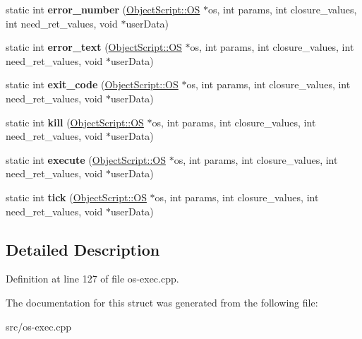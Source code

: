 \begin{DoxyCompactItemize}
\item 
static int {\bfseries error\+\_\+number} (\hyperlink{class_object_script_1_1_o_s}{Object\+Script\+::\+OS} $\ast$os, int params, int closure\+\_\+values, int need\+\_\+ret\+\_\+values, void $\ast$user\+Data)\hypertarget{struct_o_s_sub_process_a5b144fe5d751f4988e4debf73d14f3ed}{}\label{struct_o_s_sub_process_a5b144fe5d751f4988e4debf73d14f3ed}

\item 
static int {\bfseries error\+\_\+text} (\hyperlink{class_object_script_1_1_o_s}{Object\+Script\+::\+OS} $\ast$os, int params, int closure\+\_\+values, int need\+\_\+ret\+\_\+values, void $\ast$user\+Data)\hypertarget{struct_o_s_sub_process_a982f8ed232af4b48485adc2a59a46a6c}{}\label{struct_o_s_sub_process_a982f8ed232af4b48485adc2a59a46a6c}

\item 
static int {\bfseries exit\+\_\+code} (\hyperlink{class_object_script_1_1_o_s}{Object\+Script\+::\+OS} $\ast$os, int params, int closure\+\_\+values, int need\+\_\+ret\+\_\+values, void $\ast$user\+Data)\hypertarget{struct_o_s_sub_process_a17e405c8def412d47c74fc82f5cdbe7d}{}\label{struct_o_s_sub_process_a17e405c8def412d47c74fc82f5cdbe7d}

\item 
static int {\bfseries kill} (\hyperlink{class_object_script_1_1_o_s}{Object\+Script\+::\+OS} $\ast$os, int params, int closure\+\_\+values, int need\+\_\+ret\+\_\+values, void $\ast$user\+Data)\hypertarget{struct_o_s_sub_process_af7612e88a2f37c6cb6a6a48af6322e99}{}\label{struct_o_s_sub_process_af7612e88a2f37c6cb6a6a48af6322e99}

\item 
static int {\bfseries execute} (\hyperlink{class_object_script_1_1_o_s}{Object\+Script\+::\+OS} $\ast$os, int params, int closure\+\_\+values, int need\+\_\+ret\+\_\+values, void $\ast$user\+Data)\hypertarget{struct_o_s_sub_process_a765e623d4d3dc36d1ce77bae51ed4b39}{}\label{struct_o_s_sub_process_a765e623d4d3dc36d1ce77bae51ed4b39}

\item 
static int {\bfseries tick} (\hyperlink{class_object_script_1_1_o_s}{Object\+Script\+::\+OS} $\ast$os, int params, int closure\+\_\+values, int need\+\_\+ret\+\_\+values, void $\ast$user\+Data)\hypertarget{struct_o_s_sub_process_aeafadb512de416efd5465b71230e5a78}{}\label{struct_o_s_sub_process_aeafadb512de416efd5465b71230e5a78}

\end{DoxyCompactItemize}


\subsection{Detailed Description}


Definition at line 127 of file os-\/exec.\+cpp.



The documentation for this struct was generated from the following file\+:\begin{DoxyCompactItemize}
\item 
src/os-\/exec.\+cpp\end{DoxyCompactItemize}
